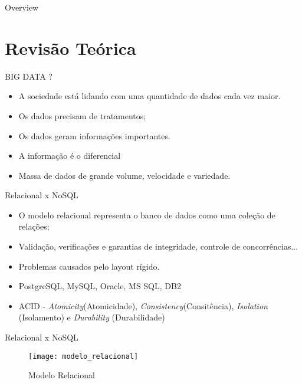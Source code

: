 
\begin{frame}
\titlepage
\end{frame}

\begin{frame}{Overview}
  \tableofcontents
\end{frame}

\section{Revisão Teórica}

\begin{frame}{BIG DATA ?}
    \begin{itemize}
    \item A sociedade está lidando com uma quantidade de dados cada vez maior.
    \item Os dados precisam de tratamentos;
    \item Os dados geram informações importantes.
    \item A informação é o diferencial
    \item Massa de dados de grande volume, velocidade e variedade.
    \end{itemize}
\end{frame}

\begin{frame}{Relacional x NoSQL}
    \begin{itemize}
    \item O modelo relacional representa o banco de dados como uma coleção de relações;
    \item Validação, verificações e garantias de integridade, controle de concorrências...
    \item Problemas causados pelo layout rígido.
    \item PostgreSQL, MySQL, Oracle, MS SQL, DB2
    \item ACID - \textit{Atomicity}(Atomicidade), \textit{Consistency}(Consitência), \textit{Isolation} (Isolamento) e \textit{Durability} (Durabilidade)
    \end{itemize}
\end{frame}

\begin{frame}{Relacional x NoSQL}
	\begin{figure}[!htbp]
		\begin{center}
			\texttt{[image: modelo\_relacional]}
		\end{center}
		\caption{Modelo Relacional }
		\label{fig:modelorelacional}
	\end{figure}
\end{frame}

